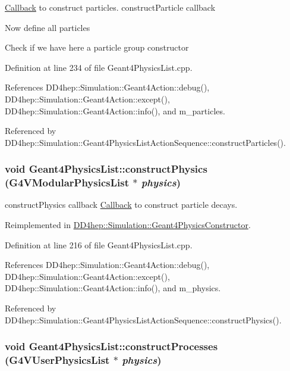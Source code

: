 \hyperlink{class_d_d4hep_1_1_callback}{Callback} to construct particles. constructParticle callback 

Now define all particles

Check if we have here a particle group constructor 

Definition at line 234 of file Geant4PhysicsList.cpp.

References DD4hep::Simulation::Geant4Action::debug(), DD4hep::Simulation::Geant4Action::except(), DD4hep::Simulation::Geant4Action::info(), and m\_\-particles.

Referenced by DD4hep::Simulation::Geant4PhysicsListActionSequence::constructParticles().\hypertarget{class_d_d4hep_1_1_simulation_1_1_geant4_physics_list_ac930c930b12719772ec5119cdec72ef1}{
\subsubsection[{constructPhysics}]{\setlength{\rightskip}{0pt plus 5cm}void Geant4PhysicsList::constructPhysics (G4VModularPhysicsList $\ast$ {\em physics})}}
\label{class_d_d4hep_1_1_simulation_1_1_geant4_physics_list_ac930c930b12719772ec5119cdec72ef1}


constructPhysics callback \hyperlink{class_d_d4hep_1_1_callback}{Callback} to construct particle decays. 

Reimplemented in \hyperlink{class_d_d4hep_1_1_simulation_1_1_geant4_physics_constructor_a97b80e1316943ae5805d8d006fa4f1b5}{DD4hep::Simulation::Geant4PhysicsConstructor}.

Definition at line 216 of file Geant4PhysicsList.cpp.

References DD4hep::Simulation::Geant4Action::debug(), DD4hep::Simulation::Geant4Action::except(), DD4hep::Simulation::Geant4Action::info(), and m\_\-physics.

Referenced by DD4hep::Simulation::Geant4PhysicsListActionSequence::constructPhysics().\hypertarget{class_d_d4hep_1_1_simulation_1_1_geant4_physics_list_ae769a12f86a3cb785c1e040c5a32d8fb}{
\subsubsection[{constructProcesses}]{\setlength{\rightskip}{0pt plus 5cm}void Geant4PhysicsList::constructProcesses (G4VUserPhysicsList $\ast$ {\em physics})}}
\label{class_d_d4hep_1_1_simulation_1_1_geant4_physics_list_ae769a12f86a3cb785c1e040c5a32d8fb}


